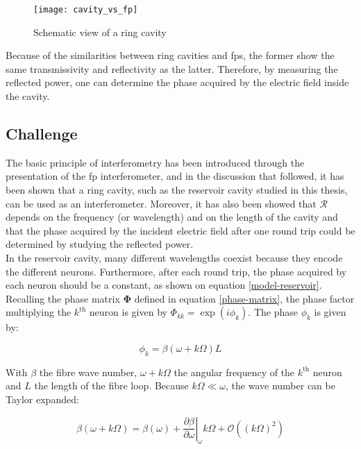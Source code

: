 \begin{figure}[h]
	\centering
	\texttt{[image: cavity\_vs\_fp]}
	\caption{Schematic view of a ring cavity}
	\label{cavity_vs_fp}
\end{figure}

Because of the similarities between ring cavities and \glspl{fp}, the former show the same transmissivity and reflectivity as the latter. Therefore, by measuring the reflected power, one can determine the phase acquired by the electric field inside the cavity.


\subsection{Challenge}

The basic principle of interferometry has been introduced through the presentation of the \gls{fp} interferometer, and in the discussion that followed, it has been shown that a ring cavity, such as the reservoir cavity studied in this thesis, can be used as an interferometer. Moreover, it has also been showed that $\mathcal{R}$ depends on the frequency (or wavelength) and on the length of the cavity and that the phase acquired by the incident electric field after one round trip could be determined by studying the reflected power.\\

In the reservoir cavity, many different wavelengths coexist because they encode the different neurons. Furthermore, after each round trip, the phase acquired by each neuron should be a constant, as shown on equation \eqref{model-reservoir}. Recalling the phase matrix $\mathbf{\Phi}$ defined in equation \eqref{phase-matrix}, the phase factor multiplying the $k^{\text{th}}$ neuron is given by $\Phi_{kk} = \exp{(i\phi_k)}$.	The phase $\phi_k$ is given by:

\begin{equation}
	\phi_k = \beta(\omega+k\Omega) L
\end{equation}

With $\beta$ the fibre wave number, $\omega+k\Omega$ the angular frequency of the $k^{\text{th}}$ neuron and $L$ the length of the fibre loop. Because $k\Omega \ll \omega$, the wave number can be Taylor expanded: 

\begin{equation}
	\beta(\omega+k\Omega) = \beta(\omega) + \left. \frac{\partial\beta}{\partial\omega}\right\rvert_\omega k\Omega + \mathcal{O}\left((k\Omega)^2\right)
\end{equation}

